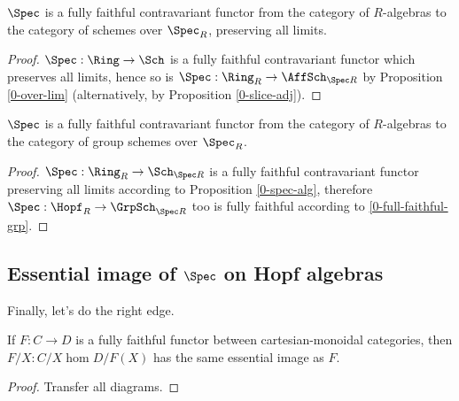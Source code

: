 \begin{proposition}
  \label{0-spec-alg}
  \uses{}
  \leanok

  $\Spec$ is a fully faithful contravariant functor from the category of $R$-algebras to the category of schemes over $\Spec_R$, preserving all limits.
\end{proposition}
\begin{proof}
  \leanok

  $\Spec : \Ring \to \Sch$ is a fully faithful contravariant functor which preserves all limits, hence so is $\Spec : \Ring_R \to \AffSch_{\Spec R}$ by Proposition \ref{0-over-lim} (alternatively, by Proposition \ref{0-slice-adj}).
\end{proof}


\begin{proposition}
  \label{0-spec-hopf}
  \uses{}
  \leanok

  $\Spec$ is a fully faithful contravariant functor from the category of $R$-algebras to the category of group schemes over $\Spec_R$.
\end{proposition}
\begin{proof}
  \leanok

  $\Spec : \Ring_R \to \Sch_{\Spec R}$ is a fully faithful contravariant functor preserving all limits according to Proposition \ref{0-spec-alg}, therefore $\Spec : \Hopf_R \to \GrpSch_{\Spec R}$ too is fully faithful according to \ref{0-full-faithful-grp}.
\end{proof}


\subsection{Essential image of $\Spec$ on Hopf algebras}


Finally, let's do the right edge.


\begin{proposition}
  \label{0-ess-image-over}
  \uses{}

  If $F : C \to D$ is a fully faithful functor between cartesian-monoidal categories, then $F / X : C / X \hom D / F(X)$ has the same essential image as $F$.
\end{proposition}
\begin{proof}
  \uses{}

  Transfer all diagrams.
\end{proof}


